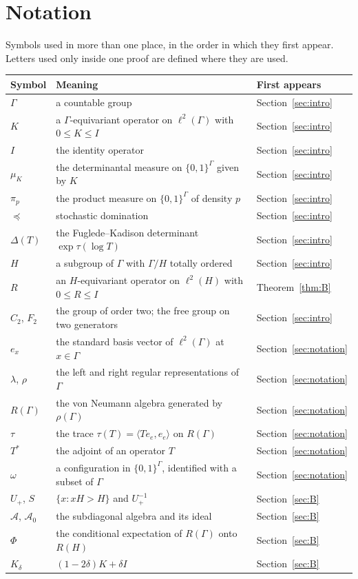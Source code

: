 \documentclass[11pt]{amsart}
\theoremstyle{remark}
\theoremstyle{definition}
\newcommand{\Ga}{\Gamma}
\newcommand{\FK}{\Delta}
\newcommand{\tr}{\tau}
\newcommand{\dom}{\preccurlyeq}
\newcommand{\ltwo}{\ell^2}
\begin{document}
\appendix
\section{Notation}\label{app:notation}

Symbols used in more than one place, in the order in which they first appear. Letters used only inside one proof are
defined where they are used.

\begin{center}\begin{tabular}{@{}lp{}l@{}}\toprule
Symbol & Meaning & First appears \\ \midrule
$\Ga$ & a countable group & Section~\ref{sec:intro} \\
$K$ & a $\Ga$-equivariant operator on $\ltwo(\Ga)$ with $0\le K\le I$ & Section~\ref{sec:intro} \\
$I$ & the identity operator & Section~\ref{sec:intro} \\
$\mu_K$ & the determinantal measure on $\{0,1\}^{\Ga}$ given by $K$ & Section~\ref{sec:intro} \\
$\pi_p$ & the product measure on $\{0,1\}^{\Ga}$ of density $p$ & Section~\ref{sec:intro} \\
$\dom$ & stochastic domination & Section~\ref{sec:intro} \\
$\FK(T)$ & the Fuglede--Kadison determinant $\exp\tr(\log T)$ & Section~\ref{sec:intro} \\
$H$ & a subgroup of $\Ga$ with $\Ga/H$ totally ordered & Section~\ref{sec:intro} \\
$R$ & an $H$-equivariant operator on $\ltwo(H)$ with $0\le R\le I$ & Theorem~\ref{thm:B} \\
$C_2$, $F_2$ & the group of order two; the free group on two generators & Section~\ref{sec:intro} \\
$e_x$ & the standard basis vector of $\ltwo(\Ga)$ at $x\in\Ga$ & Section~\ref{sec:notation} \\
$\lambda$, $\rho$ & the left and right regular representations of $\Ga$ & Section~\ref{sec:notation} \\
$R(\Ga)$ & the von Neumann algebra generated by $\rho(\Ga)$ & Section~\ref{sec:notation} \\
$\tr$ & the trace $\tr(T)=\langle Te_e,e_e\rangle$ on $R(\Ga)$ & Section~\ref{sec:notation} \\
$T^*$ & the adjoint of an operator $T$ & Section~\ref{sec:notation} \\
$\omega$ & a configuration in $\{0,1\}^{\Ga}$, identified with a subset of $\Ga$ & Section~\ref{sec:notation} \\
$U_+$, $S$ & $\{x:xH>H\}$ and $U_+^{-1}$ & Section~\ref{sec:B} \\
$\mathcal A$, $\mathcal A_0$ & the subdiagonal algebra and its ideal & Section~\ref{sec:B} \\
$\Phi$ & the conditional expectation of $R(\Ga)$ onto $R(H)$ & Section~\ref{sec:B} \\
$K_\delta$ & $(1-2\delta)K+\delta I$ & Section~\ref{sec:B} \\
\bottomrule\end{tabular}\end{center}
\end{document}
